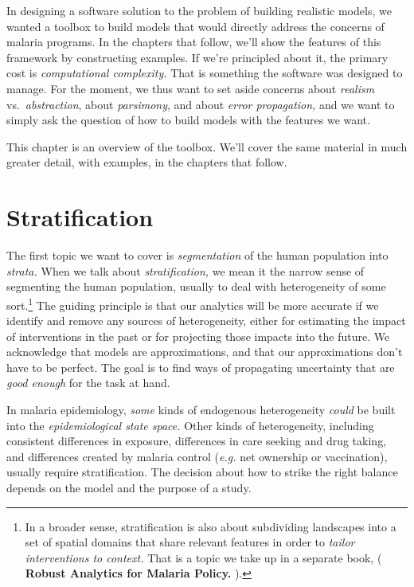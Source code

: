 \documentclass[
]{book}
\begin{document}
In designing a software solution to the problem of building realistic models, we wanted a toolbox to build models that would directly address the concerns of malaria programs. In the chapters that follow, we'll show the features of this framework by constructing examples. If we're principled about it, the primary cost is \emph{computational complexity.} That is something the software was designed to manage. For the moment, we thus want to set aside concerns about \emph{realism} vs.~\emph{abstraction}, about \emph{parsimony}, and about \emph{error propagation,} and we want to simply ask the question of how to build models with the features we want.

This chapter is an overview of the toolbox. We'll cover the same material in much greater detail, with examples, in the chapters that follow.

\hypertarget{stratification}{%
\section{Stratification}\label{stratification}}

The first topic we want to cover is \emph{segmentation} of the human population into \emph{strata.} When we talk about \emph{stratification,} we mean it the narrow sense of segmenting the human population, usually to deal with heterogeneity of some sort.\footnote{In a broader sense, stratification is also about subdividing landscapes into a set of spatial domains that share relevant features in order to \emph{tailor interventions to context.} That is a topic we take up in a separate book,
  ( \textbf{Robust Analytics for Malaria Policy.} ).}
The guiding principle is that our analytics will be more accurate if we identify and remove any sources of heterogeneity, either for estimating the impact of interventions in the past or for projecting those impacts into the future. We acknowledge that models are approximations, and that our approximations don't have to be perfect. The goal is to find ways of propagating uncertainty that are \emph{good enough} for the task at hand.

In malaria epidemiology, \emph{some} kinds of endogenous heterogeneity \emph{could} be built into the \emph{epidemiological state space.} Other kinds of heterogeneity, including consistent differences in exposure, differences in care seeking and drug taking, and differences created by malaria control (\emph{e.g.} net ownership or vaccination), usually require stratification. The decision about how to strike the right balance depends on the model and the purpose of a study.
\end{document}
